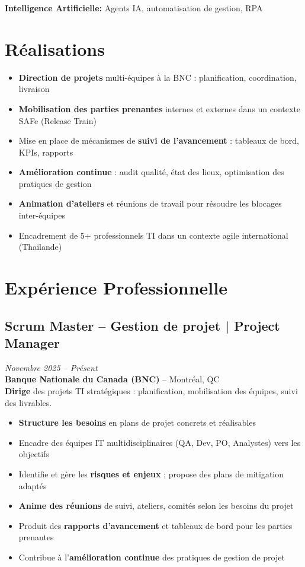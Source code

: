 \documentclass[11pt,a4paper]{article}
\begin{document}
\textbf{Intelligence Artificielle:} Agents IA, automatisation de gestion, RPA

\vspace{6pt}

\section*{Réalisations}
\begin{itemize}
    \item \textbf{Direction de projets} multi-équipes à la BNC : planification, coordination, livraison
    \item \textbf{Mobilisation des parties prenantes} internes et externes dans un contexte SAFe (Release Train)
    \item Mise en place de mécanismes de \textbf{suivi de l'avancement} : tableaux de bord, KPIs, rapports
    \item \textbf{Amélioration continue} : audit qualité, état des lieux, optimisation des pratiques de gestion
    \item \textbf{Animation d'ateliers} et réunions de travail pour résoudre les blocages inter-équipes
    \item Encadrement de 5+ professionnels TI dans un contexte agile international (Thaïlande)
\end{itemize}

\section*{Expérience Professionnelle}

\subsection*{Scrum Master -- Gestion de projet | Project Manager} \hfill \textit{Novembre 2025 -- Présent}\\
\textbf{Banque Nationale du Canada (BNC)} -- Montréal, QC\\
\textbf{Dirige} des projets TI stratégiques : planification, mobilisation des équipes, suivi des livrables.
\begin{itemize}
    \item \textbf{Structure les besoins} en plans de projet concrets et réalisables
    \item Encadre des équipes IT multidisciplinaires (QA, Dev, PO, Analystes) vers les objectifs
    \item Identifie et gère les \textbf{risques et enjeux} ; propose des plans de mitigation adaptés
    \item \textbf{Anime des réunions} de suivi, ateliers, comités selon les besoins du projet
    \item Produit des \textbf{rapports d'avancement} et tableaux de bord pour les parties prenantes
    \item Contribue à l'\textbf{amélioration continue} des pratiques de gestion de projet
\end{itemize}
\end{document}
